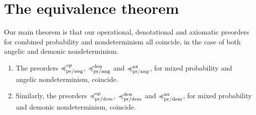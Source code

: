 \section{The equivalence theorem}

Our main theorem is that our operational, denotational and axiomatic preorders for combined probability and nondeterminism all coincide, in the case of both angelic and demonic nondeterminism.
\begin{theorem} \leavevmode
\begin{enumerate} 
\item The preorders $\preccurlyeq^{\text{op}}_{\text{pr/ang}}$, $\preccurlyeq^{\text{den}}_{\text{pr/ang}}$ and $\preccurlyeq^{\text{ax}}_{\text{pr/ang}}$, for mixed probability and angelic nondeterminism, coincide.

\item Similarly, the preorders $\preccurlyeq^{\text{op}}_{\text{pr/dem}}$, $\preccurlyeq^{\text{den}}_{\text{pr/dem}}$ and $\preccurlyeq^{\text{ax}}_{\text{pr/dem}}$,
for mixed probability and demonic nondeterminism, coincide.
\end{enumerate}
\end{theorem}

